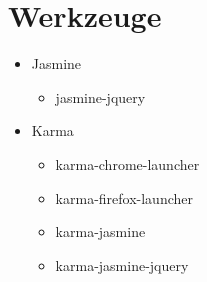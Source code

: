 \documentclass[qualitaetssicherung.tex]{subfiles}
\begin{document}
\section{Werkzeuge}\label{werkzeuge}
\begin{itemize}
	\item
	Jasmine
	\begin{itemize}
		\item
		jasmine-jquery
	\end{itemize}
	\item
	Karma
	\begin{itemize}
		\item
		karma-chrome-launcher
		\item
		karma-firefox-launcher
		\item
		karma-jasmine
		\item
		karma-jasmine-jquery
	\end{itemize}
\end{itemize}
		
\end{document}
